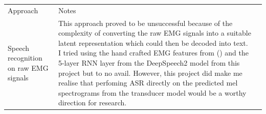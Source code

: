 {\small\begin{center}
    \begin{tabularx}{\textwidth}{ l l l }
        Approach & Notes \\
        Speech recognition on raw EMG signals &
        This approach proved to be unsuccessful because of the complexity
        of converting the raw EMG signals into a suitable latent representation
        which could then be decoded into text. I tried using the hand crafted
        EMG features from (\cite{gaddy2020digital}) and the 5-layer RNN
        layer from the DeepSpeech2 model from this project but to no avail.
        However, this project did make me realise that perfoming ASR directly
        on the predicted mel spectrograms from the transducer model would be
        a worthy direction for research.
    \end{tabularx}
\end{center}}